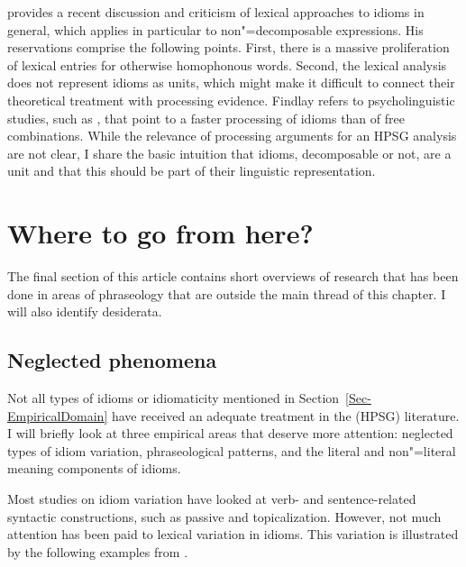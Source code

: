 \documentclass[output=paper
 	        ,biblatex
                ,babelshorthands
                ,newtxmath
                ,draftmode
                ,colorlinks, citecolor=brown
]{langscibook}
\begin{document}
\citet{Findlay:17} provides a recent discussion and criticism of lexical approaches to idioms in
general, which applies in particular to non"=decomposable expressions.  His reservations comprise
the following points.  First, there is a massive proliferation of lexical entries for otherwise
homophonous words.
%
Second, the lexical analysis does not represent idioms as units, which might make it difficult to
connect their theoretical treatment with processing evidence.  Findlay refers to psycholinguistic
studies, such as \citet{Swinney:Cutler:79}, that point to a faster processing of idioms than of free
combinations.  While the relevance of processing arguments for an HPSG analysis are not clear, I
share the basic intuition that idioms, decomposable or not, are a unit and that this should be part
of their linguistic representation.


\section{Where to go from here?}
\label{Sec-WhereToGo}

The final section of this article contains short overviews of research that has been done in areas
of phraseology that are outside the main thread of this chapter. I will also identify desiderata.


\subsection{Neglected phenomena}
\label{Sec-Neglected}

Not all types of idioms or idiomaticity mentioned in Section~\ref{Sec-EmpiricalDomain} have received
an adequate treatment in the (HPSG) literature.  I will briefly look at three empirical areas that
deserve more attention: neglected types of idiom variation, phraseological patterns, and the literal
and non"=literal meaning components of idioms.

Most studies on idiom variation have looked at verb- and sentence-related syntactic constructions,
such as passive and topicalization.  However, not much attention has been paid to lexical variation
in idioms. This variation is illustrated by the following examples from \citet[,
191]{Richards:01}.
\end{document}
